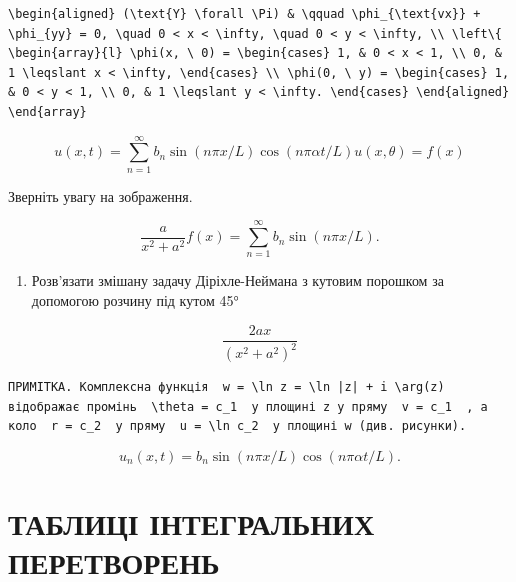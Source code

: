 \documentclass[
  ukrainian,
]{article}
\providecommand{\tightlist}{%
  \setlength{\itemsep}{0pt}\setlength{\parskip}{0pt}}
\begin{document}
\begin{verbatim}
\begin{aligned} (\text{Y} \forall \Pi) & \qquad \phi_{\text{vx}} + \phi_{yy} = 0, \quad 0 < x < \infty, \quad 0 < y < \infty, \\ \left\{ \begin{array}{l} \phi(x, \ 0) = \begin{cases} 1, & 0 < x < 1, \\ 0, & 1 \leqslant x < \infty, \end{cases} \\ \phi(0, \ y) = \begin{cases} 1, & 0 < y < 1, \\ 0, & 1 \leqslant y < \infty. \end{cases} \end{aligned} \end{array}
\end{verbatim}

\[
u(x, t) = \sum_{n=1}^{\infty} b_n \sin(n\pi x/L) \cos(n\pi\alpha t/L)
u(x, \theta) = f(x)
\]

Зверніть увагу на зображення.

\[
\frac{a}{x^2+a^2}
f(x) = \sum_{n=1}^{\infty} b_n \sin(n\pi x/L).
\]

\begin{enumerate}
\def\labelenumi{\arabic{enumi}.}
\setcounter{enumi}{3}
\tightlist
\item
  Розв'язати змішану задачу Діріхле-Неймана з кутовим порошком за
  допомогою розчину під кутом 45°
\end{enumerate}

\[
\frac{2ax}{(x^2+a^2)^2}
\]

\begin{verbatim}
ПРИМІТКА. Комплексна функція  w = \ln z = \ln |z| + i \arg(z)  відображає промінь  \theta = c_1  у площині z у пряму  v = c_1  , а коло  r = c_2  у пряму  u = \ln c_2  у площині w (див. рисунки).
\end{verbatim}

\[
u_n(x, t) = b_n \sin(n\pi x/L) \cos(n\pi\alpha t/L).
\]

\section{ТАБЛИЦІ ІНТЕГРАЛЬНИХ
ПЕРЕТВОРЕНЬ}\label{ux442ux430ux431ux43bux438ux446ux456-ux456ux43dux442ux435ux433ux440ux430ux43bux44cux43dux438ux445-ux43fux435ux440ux435ux442ux432ux43eux440ux435ux43dux44c}
\end{document}
